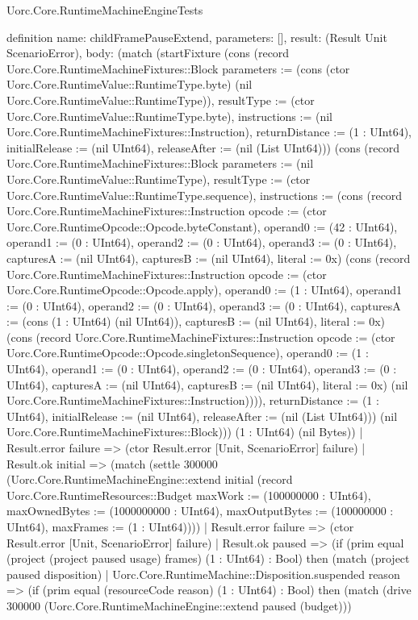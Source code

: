 \begin{lexlean}{Uorc.Core.RuntimeMachineEngineTests}
\begin{semanticmodule}
definition{
  name: childFramePauseExtend,
  parameters: [],
  result: (Result Unit ScenarioError),
  body: (match (startFixture (cons (record Uorc.Core.RuntimeMachineFixtures::Block {parameters := (cons (ctor Uorc.Core.RuntimeValue::RuntimeType.byte) (nil Uorc.Core.RuntimeValue::RuntimeType)), resultType := (ctor Uorc.Core.RuntimeValue::RuntimeType.byte), instructions := (nil Uorc.Core.RuntimeMachineFixtures::Instruction), returnDistance := (1 : UInt64), initialRelease := (nil UInt64), releaseAfter := (nil (List UInt64))}) (cons (record Uorc.Core.RuntimeMachineFixtures::Block {parameters := (nil Uorc.Core.RuntimeValue::RuntimeType), resultType := (ctor Uorc.Core.RuntimeValue::RuntimeType.sequence), instructions := (cons (record Uorc.Core.RuntimeMachineFixtures::Instruction {opcode := (ctor Uorc.Core.RuntimeOpcode::Opcode.byteConstant), operand0 := (42 : UInt64), operand1 := (0 : UInt64), operand2 := (0 : UInt64), operand3 := (0 : UInt64), capturesA := (nil UInt64), capturesB := (nil UInt64), literal := 0x}) (cons (record Uorc.Core.RuntimeMachineFixtures::Instruction {opcode := (ctor Uorc.Core.RuntimeOpcode::Opcode.apply), operand0 := (1 : UInt64), operand1 := (0 : UInt64), operand2 := (0 : UInt64), operand3 := (0 : UInt64), capturesA := (cons (1 : UInt64) (nil UInt64)), capturesB := (nil UInt64), literal := 0x}) (cons (record Uorc.Core.RuntimeMachineFixtures::Instruction {opcode := (ctor Uorc.Core.RuntimeOpcode::Opcode.singletonSequence), operand0 := (1 : UInt64), operand1 := (0 : UInt64), operand2 := (0 : UInt64), operand3 := (0 : UInt64), capturesA := (nil UInt64), capturesB := (nil UInt64), literal := 0x}) (nil Uorc.Core.RuntimeMachineFixtures::Instruction)))), returnDistance := (1 : UInt64), initialRelease := (nil UInt64), releaseAfter := (nil (List UInt64))}) (nil Uorc.Core.RuntimeMachineFixtures::Block))) (1 : UInt64) (nil Bytes))
    | Result.error failure => (ctor Result.error [Unit, ScenarioError] failure)
    | Result.ok initial => (match (settle 300000 (Uorc.Core.RuntimeMachineEngine::extend initial (record Uorc.Core.RuntimeResources::Budget {maxWork := (100000000 : UInt64), maxOwnedBytes := (1000000000 : UInt64), maxOutputBytes := (100000000 : UInt64), maxFrames := (1 : UInt64)})))
      | Result.error failure => (ctor Result.error [Unit, ScenarioError] failure)
      | Result.ok paused => (if (prim equal (project (project paused usage) frames) (1 : UInt64) : Bool) then (match (project paused disposition)
        | Uorc.Core.RuntimeMachine::Disposition.suspended reason => (if (prim equal (resourceCode reason) (1 : UInt64) : Bool) then (match (drive 300000 (Uorc.Core.RuntimeMachineEngine::extend paused (budget)))
}
\end{semanticmodule}
\end{lexlean}
